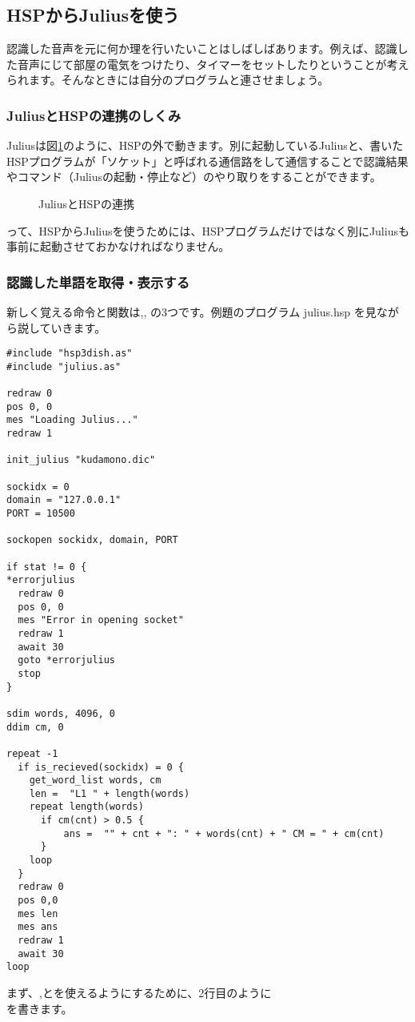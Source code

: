 \subsection{HSPからJuliusを使う}
認識した音声を元に何か理を行いたいことはしばしばあります。例えば、認識した音声にじて部屋の電気をつけたり、タイマーをセットしたりということが考えられます。そんなときには自分のプログラムと連させましょう。
\subsubsection{JuliusとHSPの連携のしくみ}
Juliusは図\ref{JuliusとHSPの連携}のように、HSPの外で動きます。別に起動しているJuliusと、書いたHSPプログラムが「ソケット」と呼ばれる通信路をして通信することで認識結果やコマンド（Juliusの起動・停止など）のやり取りをすることができます。
\begin{figure}[H]
\begin{center}
    
    \caption{JuliusとHSPの連携}
    \label{JuliusとHSPの連携}
\end{center}
\end{figure}
って、HSPからJuliusを使うためには、HSPプログラムだけではなく別にJuliusも事前に起動させておかなければなりません。

\subsubsection{認識した単語を取得・表示する}
新しく覚える命令と関数は,,  の3つです。例題のプログラム julius.hsp を見ながら説していきます。\\
\begin{lstlisting}[caption=julius.hsp,label=julius.hsp]
#include "hsp3dish.as"
#include "julius.as"

redraw 0
pos 0, 0
mes "Loading Julius..."
redraw 1

init_julius "kudamono.dic"

sockidx = 0
domain = "127.0.0.1"
PORT = 10500

sockopen sockidx, domain, PORT

if stat != 0 {
*errorjulius
  redraw 0
  pos 0, 0
  mes "Error in opening socket"
  redraw 1
  await 30
  goto *errorjulius
  stop
}

sdim words, 4096, 0
ddim cm, 0

repeat -1
  if is_recieved(sockidx) = 0 {
    get_word_list words, cm
    len =  "L1 " + length(words)
    repeat length(words)
      if cm(cnt) > 0.5 {
          ans =  "" + cnt + ": " + words(cnt) + " CM = " + cm(cnt)
      }
    loop
  }
  redraw 0
  pos 0,0
  mes len
  mes ans
  redraw 1
  await 30
loop
\end{lstlisting}
まず、,とを使えるようにするために、2行目のように\\
を書きます。

